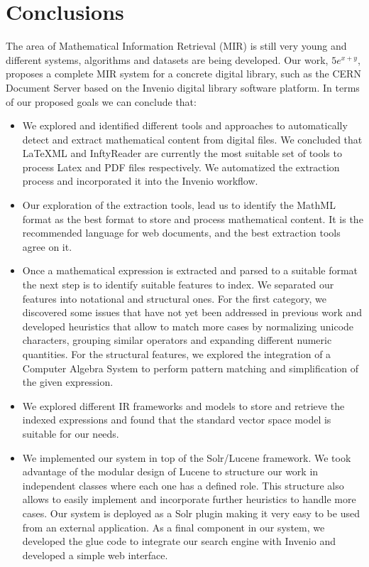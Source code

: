 \chapter{Conclusions}
\label{chap-conclusions}

The area of Mathematical Information Retrieval (MIR) is still very young and different systems, algorithms and datasets are being developed. Our work, $5e^{x+y}$, proposes a complete MIR system for a concrete digital library, such as the CERN Document Server based on the Invenio digital library software platform. In terms of our proposed goals we can conclude that:

\begin{itemize}
\item We explored and identified different tools and approaches to automatically detect and extract mathematical content from digital files. We concluded that LaTeXML and InftyReader are currently the most suitable set of tools to process Latex and PDF files respectively. We automatized the extraction process and incorporated it into the Invenio workflow.
\item Our exploration of the extraction tools, lead us to identify the MathML format as the best format to store and process mathematical content. It is the recommended language for web documents, and the best extraction tools agree on it.
\item Once a mathematical expression is extracted and parsed to a suitable format the next step is to identify suitable features to index. We separated our features into notational and structural ones. For the first category, we discovered  some issues that have not yet been addressed in previous work and developed heuristics that allow to match more cases by normalizing unicode characters, grouping similar operators and expanding different numeric quantities. For the structural features, we explored the integration of a Computer Algebra System  to perform pattern matching and simplification of the given expression. 
\item We explored different IR frameworks and models to store and retrieve the indexed expressions and found that the standard vector space model is suitable for our needs.  
\item We implemented our system in top of the Solr/Lucene framework. We took advantage of the modular design of Lucene to structure our work in independent classes where each one has a defined role. This structure also allows to easily implement and incorporate further heuristics to handle more cases. Our system is deployed as a Solr plugin making it very easy to be used from an external application. As a final component in our system, we developed the glue code to integrate our search engine with Invenio and developed a simple web interface.

\end{itemize}
